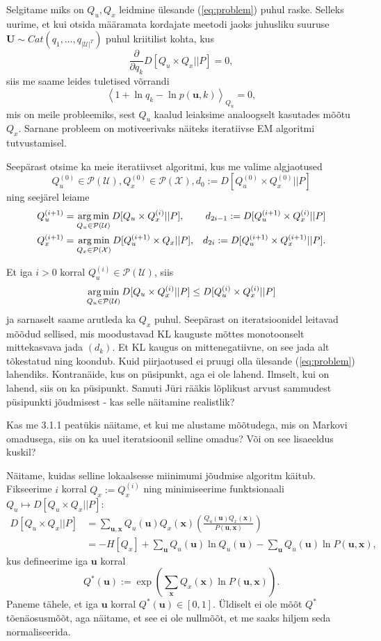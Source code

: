 Selgitame miks on $Q_u, Q_x$ leidmine ülesande (\ref{eq:problem}) puhul raske. Selleks uurime, et kui otsida määramata kordajate meetodi jaoks juhusliku suuruse $\mathbf{U} \sim Cat(q_1,\ldots,q_{|\mathcal{U}|^T})$ puhul kriitilist kohta, kus 
$$\frac{\partial}{\partial q_k} D[Q_u \times Q_x || P] = 0,$$
siis me saame leides tuletised võrrandi
$$\left< 1 + \ln q_k - \ln p(\bm{u}, k) \right>_{Q_u} = 0,$$
mis on meile probleemiks, sest $Q_u$ kaalud leiaksime analoogselt kasutades mõõtu $Q_x$. Sarnane probleem on motiveerivaks näiteks iteratiivse EM algoritmi tutvustamisel.

Seepärast otsime ka meie iteratiivset algoritmi, kus me valime algjaotused 
$$Q_u^{(0)} \in \mathcal{P}(\mathcal{U}), Q_x^{(0)} \in \mathcal{P}(\mathcal{X}), d_0 := D[Q_u^{(0)} \times Q_x^{(0)} || P]$$
ning seejärel leiame
\begin{align*}
    Q_u^{(i+1)} &= \operatorname*{arg\,min}_{Q_u \in \mathcal{P}(\mathcal{U})} D[Q_u \times Q_x^{(i)} || P],& d_{2i -1} := D[Q_u^{(i+1)} \times Q_x^{(i)} || P] \\
     Q_x^{(i+1)} &= \operatorname*{arg\,min}_{Q_x \in \mathcal{P}(\mathcal{X})} D[Q_u^{(i+1)} \times Q_x || P],& d_{2i} := D[Q_u^{(i+1)} \times Q_x^{(i+1)} || P].
\end{align*}

Et iga $i>0$ korral $Q_u^{(i)} \in \mathcal{P}(\mathcal{U})$, siis
$$ \operatorname*{arg\,min}_{Q_u \in \mathcal{P}(\mathcal{U})} D[Q_u \times Q_x^{(i)} || P] \le D[Q_u^{(i)} \times Q_x^{(i)} || P]$$
ja sarnaselt saame arutleda ka $Q_x$ puhul. Seepärast on iteratsioonidel leitavad mõõdud sellised, mis moodustavad KL kauguste mõttes monotoonselt mittekasvava jada $(d_k)$. Et KL kaugus on mittenegatiivne, on see jada alt tõkestatud ning koondub. Kuid piirjaotused ei pruugi olla ülesande (\ref{eq:problem}) lahendiks. Kontranäide, kus on püsipunkt, aga ei ole lahend. Ilmselt, kui on lahend, siis on ka püsipunkt. Samuti Jüri rääkis lõplikust arvust sammudest püsipunkti jõudmisest - kas selle näitamine realistlik? \bla

Kas me 3.1.1 peatükis näitame, et kui me alustame mõõtudega, mis on Markovi omadusega, siis on ka uuel iteratsioonil selline omadus? Või on see lisaeeldus kuskil? \bla

Näitame, kuidas selline lokaalsesse miinimumi jõudmise algoritm käitub. Fikseerime $i$ korral $Q_x := Q_x^{(i)}$ ning minimiseerime funktsionaali $Q_u \mapsto D[Q_u \times Q_x || P]$:
\begin{align*}
     D[Q_u \times Q_x || P] &= \sum_{\bm{u},\bm{x}} Q_u(\bm{u}) Q_x(\bm{x}) \left( \frac{Q_u(\bm{u}) Q_x(\bm{x})}{P(\bm{u},\bm{x})} \right) \\
     &= -H[Q_x] + \sum_{\bm{u}}Q_u(\bm{u}) \ln Q_u(\bm{u}) - \sum_{\bm{u}}Q_u(\bm{u}) \ln P(\bm{u},\bm{x}),
\end{align*}
kus defineerime iga $\bm{u}$ korral
$$Q^*(\bm{u}) := \exp \left( \sum_{\bm{x}} Q_x(\bm{x}) \ln P(\bm{u},\bm{x}) \right).$$
Paneme tähele, et iga $\bm{u}$ korral $Q^*(\bm{u}) \in [0,1]$. Üldiselt ei ole mõõt $Q^*$ tõenäosusmõõt, aga näitame, et see ei ole nullmõõt, et me saaks hiljem seda normaliseerida. 

